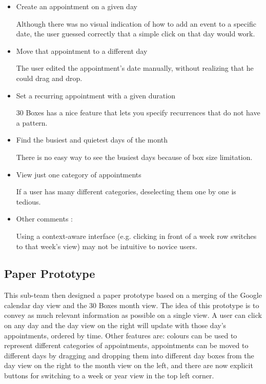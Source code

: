 \documentclass{article}
\begin{document}
\begin{itemize}
\item Create an appointment on a given day

Although there was no visual indication of how to add an event to a
specific date, the user guessed correctly that a simple click on that
day would work.

\item Move that appointment to a different day

The user edited the appointment's date manually, without realizing that
he could drag and drop.

\item Set a recurring appointment with a given duration

30 Boxes has a nice feature that lets you specify recurrences that
do not have a pattern.

\item Find the busiest and quietest days of the month

There is no easy way to see the busiest days because of box size
limitation.

\item View just one category of appointments

If a user has many different categories, deselecting them one by one is
tedious.

\item Other comments :

Using a context-aware interface (e.g. clicking in front of a week row
switches to that week's view) may not be intuitive to novice users.

\end{itemize}

\subsection{Paper Prototype}

This sub-team then designed a paper prototype based on a merging of the
Google calendar day view and the 30 Boxes month view. The idea of this
prototype is to convey as much relevant information as possible on a
single view. A user can click on any day and the day view on the right
will update with those day's appointments, ordered by time. Other
features are: colours can be used to represent different categories
of appointments, appointments can be moved to different days by
dragging and dropping them into different day boxes from the day
view on the right to the month view on the left, and there are now
explicit buttons for switching to a week or year view in the top
left corner. 
\end{document}
